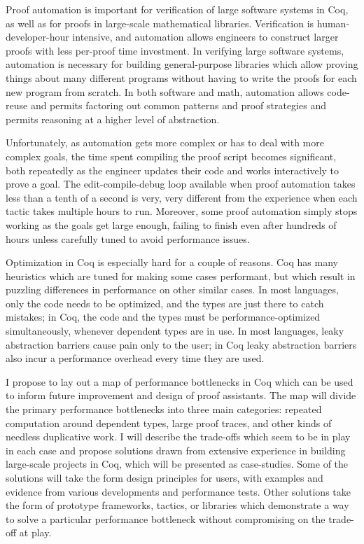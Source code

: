 \documentclass[twoside]{article}
\begin{document}
Proof automation is important for verification of large software systems in Coq, as well as for proofs in large-scale mathematical libraries.
Verification is human-developer-hour intensive, and automation allows engineers to construct larger proofs with less per-proof time investment.
In verifying large software systems, automation is necessary for building general-purpose libraries which allow proving things about many different programs without having to write the proofs for each new program from scratch.
In both software and math, automation allows code-reuse and permits factoring out common patterns and proof strategies and permits reasoning at a higher level of abstraction.

Unfortunately, as automation gets more complex or has to deal with more complex goals, the time spent compiling the proof script becomes significant, both repeatedly as the engineer updates their code and works interactively to prove a goal.
The edit-compile-debug loop available when proof automation takes less than a tenth of a second is very, very different from the experience when each tactic takes multiple hours to run.
Moreover, some proof automation simply stops working as the goals get large enough, failing to finish even after hundreds of hours unless carefully tuned to avoid performance issues.

Optimization in Coq is especially hard for a couple of reasons.
Coq has many heuristics which are tuned for making some cases performant, but which result in puzzling differences in performance on other similar cases.
In most languages, only the code needs to be optimized, and the types are just there to catch mistakes;
in Coq, the code and the types must be performance-optimized simultaneously, whenever dependent types are in use.
In most languages, leaky abstraction barriers cause pain only to the user;
in Coq leaky abstraction barriers also incur a performance overhead every time they are used.

I propose to lay out a map of performance bottlenecks in Coq which can be used to inform future improvement and design of proof assistants.
The map will divide the primary performance bottlenecks into three main categories: repeated computation around dependent types, large proof traces, and other kinds of needless duplicative work.
I will describe the trade-offs which seem to be in play in each case and propose solutions drawn from extensive experience in building large-scale projects in Coq, which will be presented as case-studies.
Some of the solutions will take the form design principles for users, with examples and evidence from various developments and performance tests.
Other solutions take the form of prototype frameworks, tactics, or libraries which demonstrate a way to solve a particular performance bottleneck without compromising on the trade-off at play.
\end{document}
